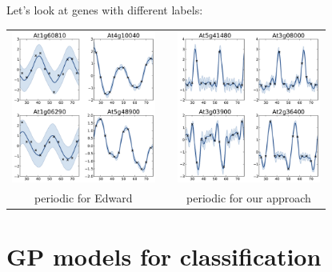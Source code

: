 \documentclass{beamer}
\begin{document}
\begin{frame}{}
Let's look at genes with different labels:
\begin{center}
 \begin{tabular}{ccc}
  \includegraphics[height=5cm]{figures/per_Ed_Only.pdf} & \qquad &\includegraphics[height=5cm]{figures/per_RKHS_Only.pdf} \\
  {\small periodic for Edward} & & {\small periodic for our approach}
 \end{tabular}
\end{center}
\end{frame}

\section[GP classification]{GP models for classification}
\subsection{}
\end{document}
